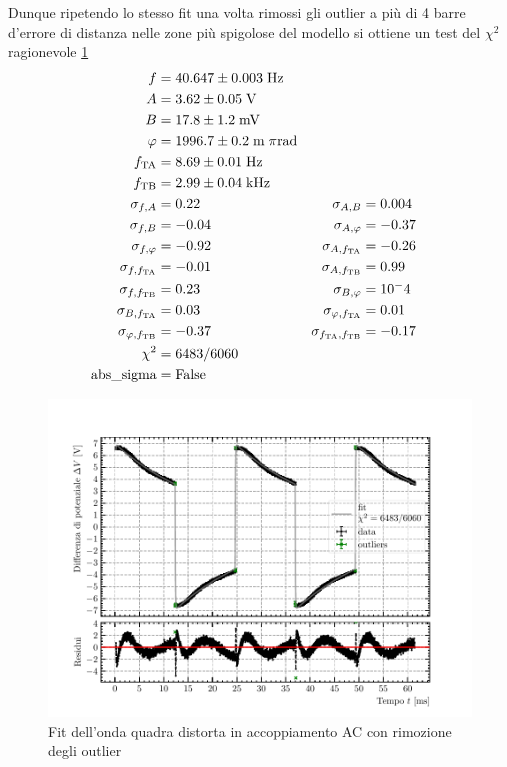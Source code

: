 \documentclass{article}[a4paper, oneside ,11pt]
\begin{document}
Dunque ripetendo lo stesso fit una volta rimossi gli outlier a più di 4 barre d'errore di distanza nelle zone più spigolose del modello si ottiene un test del $\chi^2$ ragionevole \ref{plt:AC_out}
\begin{align*}
f &= 40.647 \pm 0.003 \; \rm Hz \\
A &= 3.62 \pm 0.05 \; \rm V \\
B &= 17.8 \pm 1.2 \; \rm mV \\
\varphi &= 1996.7 \pm 0.2 \; \mathrm{m}\; \pi \si{\radian} \\
f_{\rm TA} &= 8.69 \pm 0.01 \; \rm Hz \\
f_{\rm TB} &= 2.99 \pm 0.04 \; \si{\kilo\hertz} \\
\sigma_{f, A} &= 0.22 \qquad &\sigma_{A, B} &= 0.004 \\
\sigma_{f, B} &= -0.04 \qquad &\sigma_{A, \varphi} &= -0.37 \\
\sigma_{f, \varphi} &= -0.92 \qquad &\sigma_{A, f_{\rm TA}} &= -0.26 \\
\sigma_{f, f_{\rm TA}} &= -0.01 \qquad &\sigma_{A, f_{\rm TB}} &= 0.99 \\
\sigma_{f, f_{\rm TB}} &= 0.23 \qquad &\sigma_{B, \varphi} &= 10^-4 \\
\sigma_{B, f_{\rm TA}} &= 0.03 \qquad &\sigma_{\varphi, f_{\rm TA}} &= 0.01 \\
\sigma_{\varphi, f_{\rm TB}} &= -0.37 \qquad &\sigma_{f_{\rm TA}, f_{\rm TB}} &= -0.17 \\
\chi^2 &= 6483/6060 \\
\text{abs\_sigma} &= \rm False
\end{align*}
\begin{figure}[!htb]
	\centering 
 		\includegraphics[scale=0.9]{./AC_out.pdf}
 	\caption{Fit dell'onda quadra distorta in accoppiamento AC con rimozione degli outlier \label{plt:AC_out}}
\end{figure}
\end{document}
